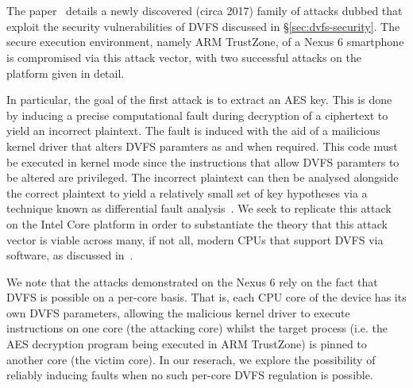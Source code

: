 \section{\clkscrew{}}

The \clkscrew{} paper~\cite{clkscrew} details a newly discovered (circa 2017)
family of attacks dubbed \clkscrew{} that exploit the security vulnerabilities
of DVFS discussed in §\ref{sec:dvfs-security}. The secure execution environment,
namely ARM TrustZone, of a Nexus 6 smartphone is compromised via this attack
vector, with two successful attacks on the platform given in detail.

In particular, the goal of the first attack is to extract an AES key. This is
done by inducing a precise computational fault during decryption of a ciphertext
to yield an incorrect plaintext. The fault is induced with the aid of a
mailicious kernel driver that alters DVFS paramters as and when required. This
code must be executed in kernel mode since the instructions that allow DVFS
paramters to be altered are privileged. The incorrect plaintext can then be
analysed alongside the correct plaintext to yield a relatively small set of key 
hypotheses via a technique known as differential fault analysis~\cite{tunstallDFA}.
We seek to replicate this attack on the Intel Core platform in order to
substantiate the theory that this attack vector is viable across many, if not
all, modern CPUs that support DVFS via software, as discussed in~\cite[§6.1]{clkscrew}.

We note that the attacks demonstrated on the Nexus 6 rely on the fact that DVFS
is possible on a per-core basis. That is, each CPU core of the device has its
own DVFS parameters, allowing the malicious kernel driver to execute
instructions on one core (the attacking core) whilst the target process (i.e.
the AES decryption program being executed in ARM TrustZone) is pinned to another
core (the victim core). In our reserach, we explore the possibility of reliably
inducing faults when no such per-core DVFS regulation is possible.
